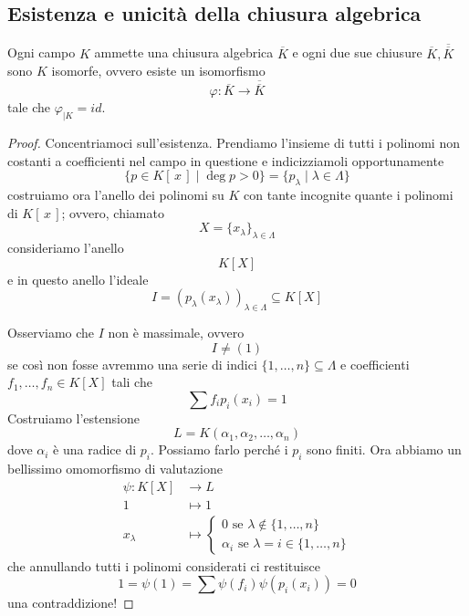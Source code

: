 \subsection{Esistenza e unicità della chiusura algebrica}
\begin{multicols}{2}
	\begin{theorem}
		Ogni campo $ K $ ammette una chiusura algebrica $ \overline{K} $ e ogni due sue chiusure $ \overline{K}, \overline{\overline{K}} $ sono $ K $ isomorfe, ovvero esiste un isomorfismo
		\[ \varphi : \overline{K} \to \overline{\overline{K}} \]
		tale che $ \varphi_{|K} = id $.
	\end{theorem}

\begin{proof}
	Concentriamoci sull'esistenza. Prendiamo l'insieme di tutti i polinomi non costanti a coefficienti nel campo in questione e indicizziamoli opportunamente
	$$  \{ p \in K[\,x\,] \mid \deg p > 0 \} = \{p_\lambda \mid \lambda \in \Lambda\}  $$
	costruiamo ora l'anello dei polinomi su $ K $ con tante incognite quante i polinomi di $ K[\,x\,] $; ovvero, chiamato
	\[ X = \{ x_\lambda \}_{\lambda \in \Lambda} \]
	consideriamo l'anello
	\[ K[X] \]
	e in questo anello l'ideale
	\[ I = (p_{\lambda}(x_{\lambda}))_{\lambda \in \Lambda} \subseteq K[X] \]
	
	Osserviamo che $ I $ non è massimale, ovvero
	\[ I \neq (1) \]
	se così non fosse avremmo una serie di indici $ \{1, \dots, n\} \subseteq \Lambda $ e coefficienti $ f_1, \dots, f_n \in K[X] $ tali che
	\[ \sum f_i p_i(x_i) = 1 \]
	Costruiamo l'estensione 
	$$  L = K(\alpha_1, \alpha_2, \dots, \alpha_n)  $$
	dove $ \alpha_i $ è una radice di $ p_i $. Possiamo farlo perché i $ p_i $ sono finiti.
	Ora abbiamo un bellissimo omomorfismo di valutazione
	\begin{align*}
	\psi \colon K[X] &\to L \\
	1 &\mapsto 1 \\
	x_\lambda &\mapsto \begin{cases}
	0 \text{ se } \lambda \notin \{1, \dots, n\}\\
	\alpha_i \text{ se } \lambda = i \in \{1, \dots, n\}
	\end{cases} 
	\end{align*}
	che annullando tutti i polinomi considerati ci restituisce
	\[ 1 = \psi(1) = \sum \psi(f_i)\psi(p_i(x_i)) = 0 \]
	una contraddizione!
	

\end{proof}
\end{multicols}
